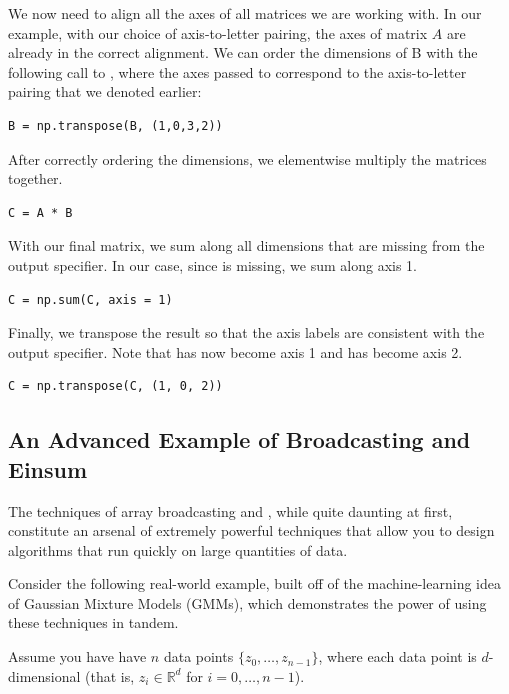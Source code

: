 We now need to align all the axes of all matrices we are working with.
In our example, with our choice of axis-to-letter pairing, the axes of matrix $A$ are already in the correct alignment. 
We can order the dimensions of B with the following call to , where the axes passed to  correspond to the axis-to-letter pairing that we denoted earlier:

\begin{lstlisting}
B = np.transpose(B, (1,0,3,2))
\end{lstlisting}

After correctly ordering the dimensions, we elementwise multiply the matrices together. 

\begin{lstlisting}
C = A * B
\end{lstlisting}

With our final matrix, we sum along all dimensions that are missing from the output specifier. In our case, since  is missing, we sum along axis 1. 

\begin{lstlisting}
C = np.sum(C, axis = 1)
\end{lstlisting}

Finally, we  transpose the result so that the axis labels are consistent with the output specifier. Note that  has now become axis 1 and  has become axis 2.

\begin{lstlisting}
C = np.transpose(C, (1, 0, 2))
\end{lstlisting}


\subsection*{An Advanced Example of Broadcasting and Einsum} %
The techniques of array broadcasting and , while quite daunting at first, constitute an arsenal of extremely powerful techniques that allow you to design algorithms that run quickly on large quantities of data.

Consider the following real-world example, built off of the machine-learning idea of Gaussian Mixture Models (GMMs), which demonstrates the power of using these techniques in tandem.

Assume you have have $n$ data points $\{z_0, \ldots, z_{n-1}\}$, where each data point is $d$-dimensional (that is, $z_i \in \mathbb{R}^d$ for $i = 0, \ldots, n-1$). 

